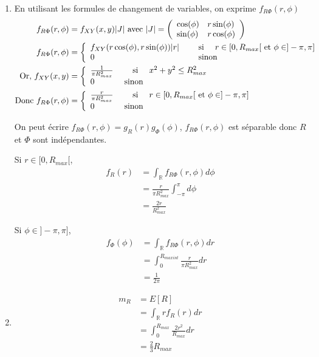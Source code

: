 \documentclass[main.tex]{subfiles}
\begin{document}
\begin{enumerate}
\item En utilisant les formules de changement de variables, on exprime $f_{R\Phi}(r,\phi)$
\begin{align*}
f_{R\Phi}(r,\phi) & = f_{XY}(x,y) |J| \text{ avec } |J| =
\left( 
\begin{array}{ll} 
\cos(\phi) & \-r\sin(\phi) \\ 
\sin(\phi) & r\cos(\phi) 
\end{array} 
\right) \\
f_{R\Phi}(r,\phi) & = 
\left\{
\begin{array}{ll}
f_{XY}(r\cos(\phi),r\sin(\phi))|r| & \quad\text{ si }\quad r\in[0,R_{max}[ \text{ et } \phi \in ]-\pi,\pi] \\
0 & \quad\text{ sinon}\quad
\end{array}
\right. \\
\text{ Or, } f_{XY}(x,y) & = 
\left\{
\begin{array}{ll}
\frac{1}{\pi R_{max}^2} & \quad\text{ si }\quad x^2 + y^2 \leq R_{max}^2 \\
0 & \text{ sinon}
\end{array}
\right. \\
\text{Donc } 
f_{R\Phi}(r,\phi) & =
\left\{
\begin{array}{ll}
\frac{r}{\pi R_{max}^2} & \quad\text{ si }\quad r\in[0,R_{max}[ \text{ et } \phi \in ]-\pi,\pi] \\
0 & \text{ sinon}
\end{array}
\right. \\
\end{align*}

On peut écrire $ f_{R\Phi}(r,\phi) = g_R(r)g_{\Phi}(\phi) $, $ f_{R\Phi}(r,\phi)$ est séparable donc $R$ et $\Phi$ sont indépendantes.

\begin{multicols}{2}
Si $r\in[0,R_{max}[$, 
\begin{align*}
f_R(r) & = \int_{\mathbb{R}} f_{R\Phi}(r,\phi) d\phi \\
& = \frac{r}{\pi R_{max}^2} \int_{-\pi}^{\pi} d\phi \\
& = \frac{2r}{R_{max}^2}
\end{align*}

Si $\phi\in]-\pi,\pi]$,
\begin{align*}
f_{\Phi}(\phi) & = \int_{\mathbb{R}} f_{R\Phi}(r,\phi) dr \\
& = \int_0^{R_{maxint}} \frac{r}{\pi R_{max}^2}dr \\
& = \frac{1}{2\pi}
\end{align*}
\end{multicols}

\item 
\begin{align*}
m_R & = E[R] \\
& = \int_{\mathbb{R}}rf_R(r)dr \\
& = \int_0^{R_{max}} \frac{2r^2}{R_{max}} dr \\
& = \frac{2}{3}R_{max}
\end{align*}
\end{enumerate}
\end{document}
